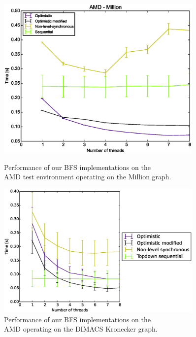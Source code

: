 \documentclass[letterpaper]{article}
\begin{document}
		\begin{figure}
			\centering
			\begin{minipage}{.5\textwidth}
				\centering
	  			\includegraphics[width=0.9\textwidth]{amd_million.eps}
	  			\vspace*{-0.3cm}
	  			\caption[caption]{Performance of our BFS implementations on the \\ \hspace{\textwidth} AMD test environment operating on the Million graph.\label{fig:amdbig}}
			\end{minipage}%
			\begin{minipage}{.5\textwidth}
				\centering
	  			\includegraphics[width=0.9\textwidth]{amd_dimacskron.eps}
	  			\vspace*{-0.3cm}
	  			\caption[caption]{Performance of our BFS implementations on the \\ \hspace{\textwidth} AMD operating on the DIMACS Kronecker graph.\label{fig:amdkron}}
			\end{minipage}%
		\end{figure}
		
\end{document}
